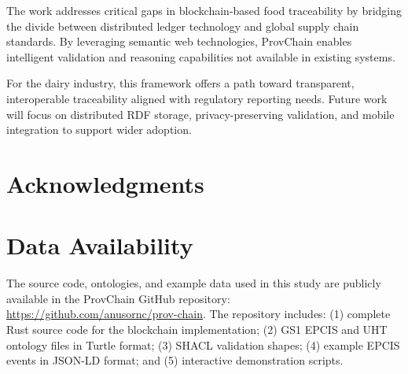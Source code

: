 \documentclass[preprint,review,12pt,authoryear]{elsarticle}
\begin{document}
The work addresses critical gaps in blockchain-based food traceability by bridging the divide between distributed ledger technology and global supply chain standards. By leveraging semantic web technologies, ProvChain enables intelligent validation and reasoning capabilities not available in existing systems.

For the dairy industry, this framework offers a path toward transparent, interoperable traceability aligned with regulatory reporting needs. Future work will focus on distributed RDF storage, privacy-preserving validation, and mobile integration to support wider adoption.

\section*{Acknowledgments}


\section*{Data Availability}

The source code, ontologies, and example data used in this study are publicly available in the ProvChain GitHub repository: \url{https://github.com/anusornc/prov-chain}. The repository includes: (1) complete Rust source code for the blockchain implementation; (2) GS1 EPCIS and UHT ontology files in Turtle format; (3) SHACL validation shapes; (4) example EPCIS events in JSON-LD format; and (5) interactive demonstration scripts.



\end{document}
